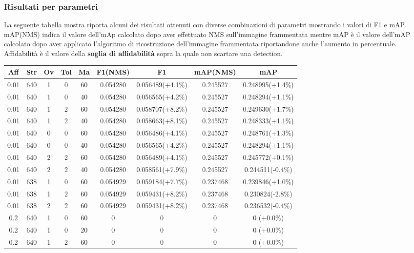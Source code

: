 \clearpage
\subsubsection{Risultati per parametri}
La seguente tabella mostra riporta alcuni dei risultati ottenuti con diverse combinazioni di parametri mostrando i valori di F1 e mAP. mAP(NMS) indica il valore dell'mAp calcolato dopo aver effettuato NMS sull'immagine frammentata mentre mAP è il valore dell'mAP calcolato dopo aver applicato l'algoritmo di ricostruzione dell'immagine frammentata riportandone anche l'aumento in percentuale. Affidabilità è il valore della \textbf{soglia di affidabilità} sopra la quale non scartare una detection.

\begin{table}[h!]
\centering
\begin{tabular}{|c|c|c|c|c|c|c|c|c|} 
\hline
Aff & Str & Ov & Tol & Ma & F1(NMS) & F1 & mAP(NMS) & mAP\\ [0.5ex] 
\hline
0.01 & 640 & 1 & 0 & 60 & 0.054280 & 0.056489(+4.1\%) & 0.245527 & 0.248995(+1.4\%)\\
0.01 & 640 & 1 & 0 & 40 & 0.054280 & 0.056565(+4.2\%) & 0.245527 & 0.248294(+1.1\%)\\
0.01 & 640 & 1 & 2 & 60 & 0.054280 & 0.058707(+8.2\%) & 0.245527 & 0.249630(+1.7\%)\\
0.01 & 640 & 1 & 2 & 40 & 0.054280 & 0.058663(+8.1\%) & 0.245527 & 0.248333(+1.1\%)\\
0.01 & 640 & 0 & 0 & 60 & 0.054280 & 0.056486(+4.1\%) & 0.245527 & 0.248761(+1.3\%)\\
0.01 & 640 & 0 & 0 & 40 & 0.054280 & 0.056565(+4.2\%) & 0.245527 & 0.248294(+1.1\%)\\
0.01 & 640 & 2 & 2 & 60 & 0.054280 & 0.056489(+4.1\%) & 0.245527 & 0.245772(+0.1\%)\\
0.01 & 640 & 2 & 2 & 40 & 0.054280 & 0.058561(+7.9\%) & 0.245527 & 0.244511(-0.4\%)\\
0.01 & 638 & 1 & 0 & 60 & 0.054929 & 0.059184(+7.7\%) & 0.237468 & 0.239846(+1.0\%)\\
0.01 & 638 & 1 & 2 & 60 & 0.054929 & 0.059431(+8.2\%) & 0.237468 & 0.230824(-2.8\%)\\
0.01 & 638 & 2 & 2 & 60 & 0.054929 & 0.059431(+8.2\%) & 0.237468 & 0.236532(-0.4\%)\\
0.2 & 640 & 1 & 0 & 60 & 0 & 0 & 0 & 0 (+0.0\%)\\
0.2 & 640 & 1 & 0 & 20 & 0 & 0 & 0 & 0 (+0.0\%)\\
0.2 & 640 & 1 & 2 & 60 & 0 & 0 & 0 & 0 (+0.0\%)\\

\end{tabular}
\end{table}
